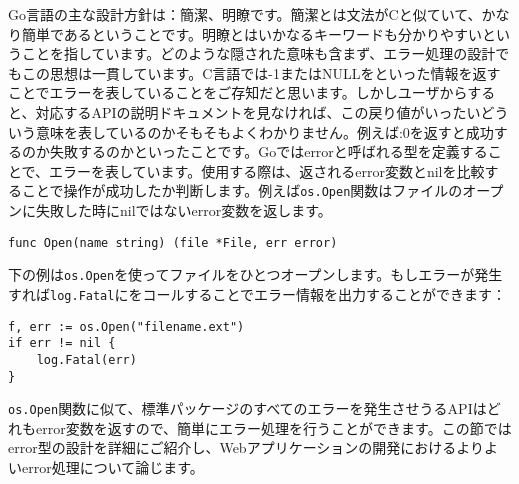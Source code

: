 Go言語の主な設計方針は：簡潔、明瞭です。簡潔とは文法がCと似ていて、かなり簡単であるということです。明瞭とはいかなるキーワードも分かりやすいということを指しています。どのような隠された意味も含まず、エラー処理の設計でもこの思想は一貫しています。C言語では-1またはNULLをといった情報を返すことでエラーを表していることをご存知だと思います。しかしユーザからすると、対応するAPIの説明ドキュメントを見なければ、この戻り値がいったいどういう意味を表しているのかそもそもよくわかりません。例えば:0を返すと成功するのか失敗するのかといったことです。Goではerrorと呼ばれる型を定義することで、エラーを表しています。使用する際は、返されるerror変数とnilを比較することで操作が成功したか判断します。例えば\texttt{os.Open}関数はファイルのオープンに失敗した時にnilではないerror変数を返します。

\begin{lstlisting}[numbers=none]
func Open(name string) (file *File, err error)
\end{lstlisting}

下の例は\texttt{os.Open}を使ってファイルをひとつオープンします。もしエラーが発生すれば\texttt{log.Fatal}にをコールすることでエラー情報を出力することができます：



\begin{lstlisting}[numbers=none]
f, err := os.Open("filename.ext")
if err != nil {
    log.Fatal(err)
}
\end{lstlisting}

\texttt{os.Open}関数に似て、標準パッケージのすべてのエラーを発生させうるAPIはどれもerror変数を返すので、簡単にエラー処理を行うことができます。この節ではerror型の設計を詳細にご紹介し、Webアプリケーションの開発におけるよりよいerror処理について論じます。
